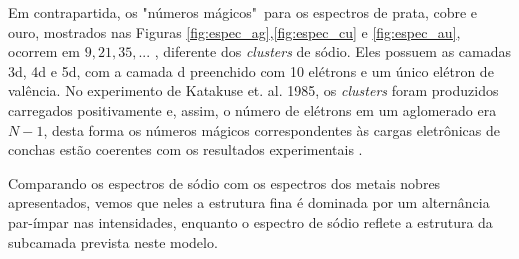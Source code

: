 Em contrapartida, os "números mágicos"\ para os espectros de prata, cobre e ouro, mostrados nas Figuras \ref{fig:espec_ag},\ref{fig:espec_cu} e \ref{fig:espec_au}, ocorrem em
$9, 21, 35,...$ , diferente dos \textit{clusters} de sódio. Eles possuem as camadas 3d, 4d e 5d, com a camada d preenchido com 10 elétrons e um único elétron de valência. No experimento de Katakuse et. al. 1985,  os \textit{clusters} foram produzidos carregados positivamente e, assim, o número de elétrons em um aglomerado era $N - 1$, desta forma os números mágicos correspondentes às cargas eletrônicas de conchas estão coerentes com os resultados experimentais \cite{Heer}.

Comparando os espectros de sódio com os espectros dos metais nobres apresentados, vemos que neles a estrutura fina é dominada por um alternância par-ímpar nas intensidades, enquanto o espectro de sódio reflete a estrutura da subcamada prevista neste modelo. 




